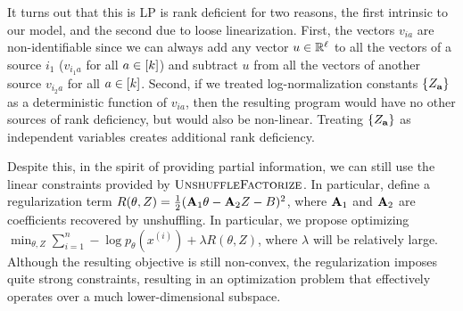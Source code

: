It turns out that this is LP is rank deficient for two reasons,
the first intrinsic to our model,
and the second due to loose linearization.
First, the vectors $v_{ia}$ are non-identifiable since we can always add any vector $u \in \mathbb{R}^\ell$ to
all the vectors of a source $i_1$ ($v_{i_1 a}$ for all $a \in [k]$)
and subtract $u$ from all the vectors of another source $v_{i_2 a}$ for all $a \in [k]$.
Second, if we treated log-normalization constants $\{Z_{\mathbf{a}}\}$ as a deterministic
function of $v_{ia}$, then the resulting program would have no other sources
of rank deficiency, but would also be non-linear.
Treating $\{Z_{\mathbf{a}}\}$ as independent variables creates additional rank
deficiency.

Despite this, in the spirit of providing partial information,
we can still use the linear constraints provided by $\text{\sc UnshuffleFactorize}$.
In particular, define a regularization term
$R(\theta, Z) = \frac{1}{2} (\mathbf{A}_1 \theta - \mathbf{A}_2 Z - B)^2$, where $\mathbf{A}_1$ and $\mathbf{A}_2$ are coefficients
recovered by unshuffling.
In particular, we propose optimizing $\min_{\theta, Z} \sum_{i=1}^n -\log
p_\theta(x^{(i)}) + \lambda R(\theta, Z)$,
where $\lambda$ will be relatively large.
Although the resulting objective is still non-convex,
the regularization imposes quite strong constraints,
resulting in an optimization problem
that effectively operates over a much lower-dimensional subspace.
